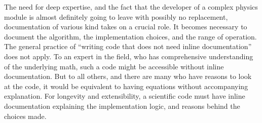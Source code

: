 The need for deep expertise, and the fact that the developer of a
complex physics module is almost definitely going to leave with
possibly no replacement, documentation of various kind takes on a
crucial role. It becomes necessary to document the algorithm, the
implementation choices, and the range of operation. The general
practice of ``writing code that does not need inline documentation''
does not apply. To an expert in the field, who has comprehensive
understanding of the underlying math, such a code might be accessible
without inline documentation. But to all others, and there are many
who have reasons to look at the code, it would be equivalent to having
equations without accompanying explanation. For longevity and
extensibility, a scientific code must have inline documentation
explaining the implementation logic, and reasons behind the
choices made.   

